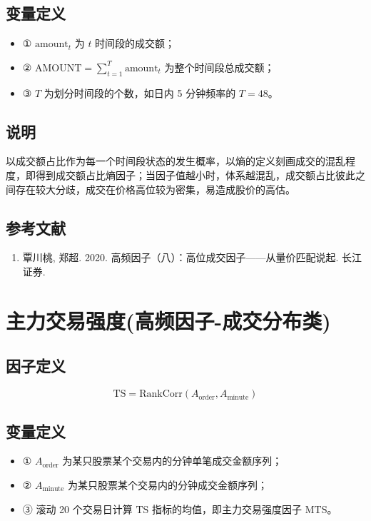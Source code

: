 \documentclass{article}
\begin{document}
\subsection{变量定义}
\begin{itemize}
    \item ① \( \mathrm{amount}_t \) 为 \( t \) 时间段的成交额；
    \item ② \(\displaystyle \mathrm{AMOUNT} = \sum_{t=1}^T \mathrm{amount}_t\) 为整个时间段总成交额；
    \item ③ \( T \) 为划分时间段的个数，如日内 5 分钟频率的 \( T=48 \)。
\end{itemize}

\subsection{说明}
以成交额占比作为每一个时间段状态的发生概率，以熵的定义刻画成交的混乱程度，即得到成交额占比熵因子；当因子值越小时，体系越混乱，成交额占比彼此之间存在较大分歧，成交在价格高位较为密集，易造成股价的高估。

\subsection{参考文献}
\begin{enumerate}
    \item 覃川桃, 郑超. 2020. 高频因子（八）：高位成交因子——从量价匹配说起. 长江证券.
\end{enumerate}

\section{主力交易强度(高频因子-成交分布类)}

\subsection{因子定义}
\begin{equation}
    \mathrm{TS} = \mathrm{RankCorr}(A_{\mathrm{order}}, A_{\mathrm{minute}})
\end{equation}

\subsection{变量定义}
\begin{itemize}
    \item ① \( A_{\mathrm{order}} \) 为某只股票某个交易内的分钟单笔成交金额序列；
    \item ② \( A_{\mathrm{minute}} \) 为某只股票某个交易内的分钟成交金额序列；
    \item ③ 滚动 20 个交易日计算 \( \mathrm{TS} \) 指标的均值，即主力交易强度因子 \( \mathrm{MTS} \)。
\end{itemize}
\end{document}
